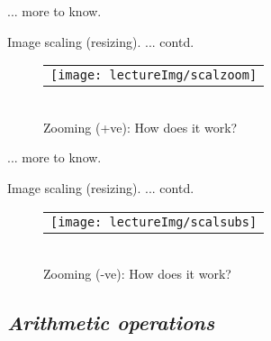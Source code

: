 \documentclass{response}
\begin{document}
{%
\newpage

\bigskip

{\huge ... more to know.} 

{\huge Image scaling (resizing).} ... contd.
\bigskip



\begin{figure}[hpb]
\begin{tabular}{l}
\texttt{[image: lectureImg/scalzoom]} \\
\end{tabular}
\mbox{}\\[20pt]
Zooming (+ve): How does it work?
\end{figure}





\newpage

\bigskip

{\huge ... more to know.} 

{\huge Image scaling (resizing).} ... contd.
\bigskip

\begin{figure}[hbp]
\begin{tabular}{l}
\texttt{[image: lectureImg/scalsubs]} 
\end{tabular}
\mbox{}\\[20pt]
Zooming (-ve): How does it work?
\end{figure}



}


\newpage

\subsection*{\Huge\em Arithmetic operations}
\bigskip
\end{document}
